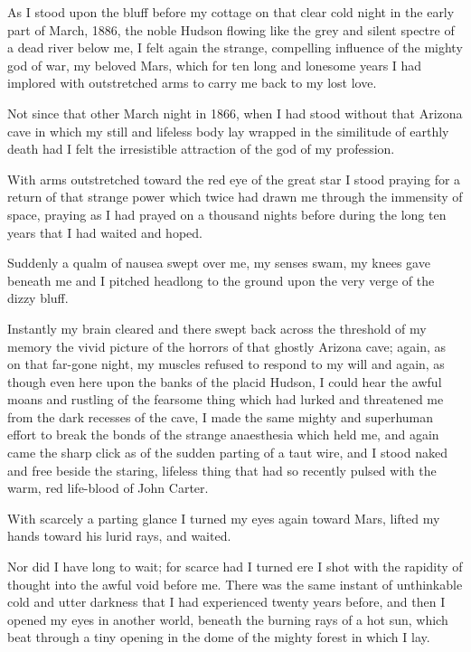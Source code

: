\documentclass[11pt,a4paper,twocolumn]{article}
\begin{document}
As I stood upon the bluff before my cottage on that clear cold night in
the early part of March, 1886, the noble Hudson flowing like the grey
and silent spectre of a dead river below me, I felt again the strange,
compelling influence of the mighty god of war, my beloved Mars, which
for ten long and lonesome years I had implored with outstretched arms
to carry me back to my lost love.

Not since that other March night in 1866, when I had stood without that
Arizona cave in which my still and lifeless body lay wrapped in the
similitude of earthly death had I felt the irresistible attraction of
the god of my profession.

With arms outstretched toward the red eye of the great star I stood
praying for a return of that strange power which twice had drawn me
through the immensity of space, praying as I had prayed on a thousand
nights before during the long ten years that I had waited and hoped.

Suddenly a qualm of nausea swept over me, my senses swam, my knees gave
beneath me and I pitched headlong to the ground upon the very verge of
the dizzy bluff.

Instantly my brain cleared and there swept back across the threshold of
my memory the vivid picture of the horrors of that ghostly Arizona
cave; again, as on that far-gone night, my muscles refused to respond
to my will and again, as though even here upon the banks of the placid
Hudson, I could hear the awful moans and rustling of the fearsome thing
which had lurked and threatened me from the dark recesses of the cave,
I made the same mighty and superhuman effort to break the bonds of the
strange anaesthesia which held me, and again came the sharp click as of
the sudden parting of a taut wire, and I stood naked and free beside
the staring, lifeless thing that had so recently pulsed with the warm,
red life-blood of John Carter.

With scarcely a parting glance I turned my eyes again toward Mars,
lifted my hands toward his lurid rays, and waited.

Nor did I have long to wait; for scarce had I turned ere I shot with
the rapidity of thought into the awful void before me.  There was the
same instant of unthinkable cold and utter darkness that I had
experienced twenty years before, and then I opened my eyes in another
world, beneath the burning rays of a hot sun, which beat through a tiny
opening in the dome of the mighty forest in which I lay.
\end{document}
